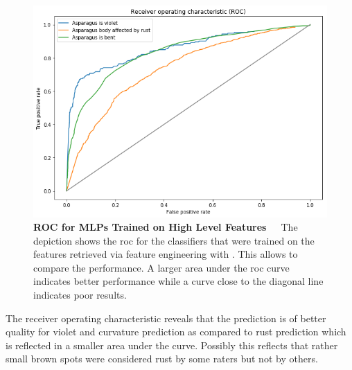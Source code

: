 \begin{figure}[!htb]
	\centering
	\includegraphics[scale=0.6]{Figures/chapter04/fe_roc.png}
	\caption[Feature Engineering ROC Curve]{\textbf{ROC for MLPs Trained on High Level Features}~~~The depiction shows the \acrfull{roc} for the classifiers that were trained on the features retrieved via feature engineering with . This allows to compare the performance. A larger area under the \acrshort{roc} curve indicates better performance while a curve close to the diagonal line indicates poor results.}
	\label{fig:FeatureEngineeringROC}
\end{figure}

The receiver operating characteristic reveals that the prediction is of better quality for violet and curvature prediction as compared to rust prediction which is reflected in a smaller area under the curve. Possibly this reflects that rather small brown spots were considered rust by some raters but not by others. 

